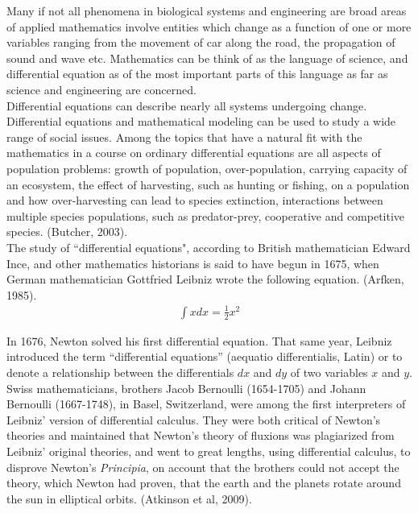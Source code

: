 \documentclass[11pt]{report}
\newcommand{\NI}{\noindent}
\begin{document}
	\NI Many if not all phenomena in biological systems and engineering are broad areas of applied mathematics involve entities which change as a function of one or more variables ranging from the movement of car along the road, the propagation of sound and wave etc. Mathematics can be think of as the language of science, and differential equation as of the most important parts of this language as far as science and engineering are concerned.\\ 
	
	\NI Differential equations can describe nearly all systems undergoing change. Differential equations and mathematical modeling can be used to study a wide range of social issues. Among the topics that have a natural fit with the mathematics in a course on ordinary differential equations are all aspects of population problems: growth of population, over-population, carrying capacity of an ecosystem, the effect of harvesting, such as hunting or fishing, on a population and how over-harvesting can lead to species extinction, interactions between multiple species populations, such as predator-prey, cooperative and competitive species. (Butcher, 2003).\\
	
	\NI The study of ``differential equations", according to British mathematician Edward Ince, and other mathematics historians is said to have begun in 1675, when German mathematician Gottfried Leibniz wrote the following equation. (Arfken, 1985).
	\begin{eqnarray*}
		\int x dx = \frac{1}{2}x^2
	\end{eqnarray*}
	
	\NI In 1676, Newton solved his first differential equation. That same year, Leibniz introduced the term ``differential equations” (aequatio differentialis, Latin) or to denote a relationship between the differentials $dx$ and $dy$ of two variables $x$ and $y$.\\
	
	\NI Swiss mathematicians, brothers Jacob Bernoulli (1654-1705) and Johann Bernoulli (1667-1748), in Basel, Switzerland, were among the first interpreters of Leibniz' version of differential calculus. They were both critical of Newton's theories and maintained that Newton’s theory of fluxions was plagiarized from Leibniz' original theories, and went to great lengths, using differential calculus, to disprove Newton’s \emph{Principia}, on account that the brothers could not accept the theory, which Newton had proven, that the earth and the planets rotate around the sun in elliptical orbits. (Atkinson et al, 2009).\\
	
\end{document}
